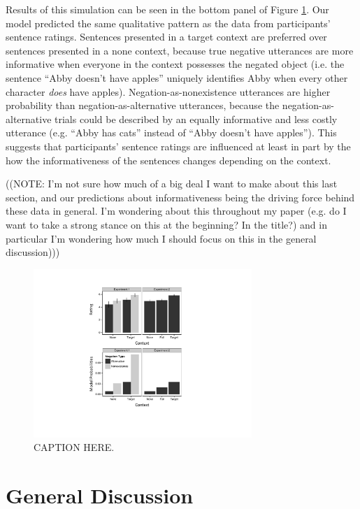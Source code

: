\documentclass[10pt,letterpaper]{article}
\begin{document}
Results of this simulation can be seen in the bottom panel of Figure \ref{fig:modelvdata}.  Our model predicted the same qualitative pattern as the data from participants' sentence ratings.  Sentences presented in a target context are preferred over sentences presented in a none context, because true negative utterances are more informative when everyone in the context possesses the negated object (i.e. the sentence ``Abby doesn't have apples'' uniquely identifies Abby when every other character \emph{does} have apples).  Negation-as-nonexistence utterances are higher probability than negation-as-alternative utterances, because the negation-as-alternative trials could be described by an equally informative and less costly utterance (e.g. ``Abby has cats'' instead of ``Abby doesn't have apples'').  This suggests that participants' sentence ratings are influenced at least in part by the how the informativeness of the sentences changes depending on the context.  

((NOTE: I'm not sure how much of a big deal I want to make about this last section, and our predictions about informativeness being the driving force behind these data in general.  I'm wondering about this throughout my paper (e.g. do I want to take a strong stance on this at the beginning?  In the title?) and in particular I'm wondering how much I should focus on this in the general discussion)))
 

\begin{figure}
\begin{center} 
\includegraphics[width=3.25in]{figures/modelcomp.pdf}
\caption{\label{fig:modelvdata} CAPTION HERE.}
\end{center} 
\end{figure}


\section{General Discussion}



\setlength{\bibleftmargin}{.125in}
\setlength{\bibindent}{-\bibleftmargin}


\end{document}
